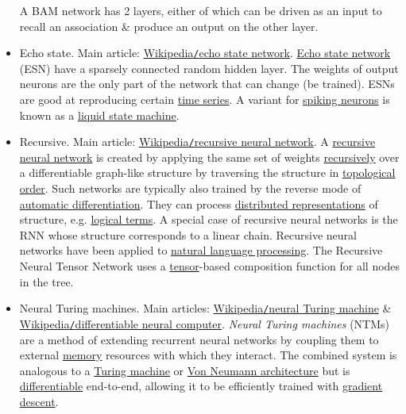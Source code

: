 \documentclass{article}
\begin{document}
\begin{itemize}
	A BAM network has 2 layers, either of which can be driven as an input to recall an association \& produce an output on the other layer.
	\item {\sf Echo state.} Main article: \href{https://en.wikipedia.org/wiki/Echo_state_network}{Wikipedia{\tt/}echo state network}. \href{https://en.wikipedia.org/wiki/Echo_state_network}{Echo state network} (ESN) have a sparsely connected random hidden layer. The weights of output neurons are the only part of the network that can change (be trained). ESNs are good at reproducing certain \href{https://en.wikipedia.org/wiki/Time_series}{time series}. A variant for \href{https://en.wikipedia.org/wiki/Spiking_neural_network}{spiking neurons} is known as a \href{https://en.wikipedia.org/wiki/Liquid_state_machine}{liquid state machine}.
	\item {\sf Recursive.} Main article: \href{https://en.wikipedia.org/wiki/Recursive_neural_network}{Wikipedia{\tt/}recursive neural network}. A \href{https://en.wikipedia.org/wiki/Recursive_neural_network}{recursive neural network} is created by applying the same set of weights \href{https://en.wikipedia.org/wiki/Recursion}{recursively} over a differentiable graph-like structure by traversing the structure in \href{https://en.wikipedia.org/wiki/Topological_sort}{topological order}. Such networks are typically also trained by the reverse mode of \href{https://en.wikipedia.org/wiki/Automatic_differentiation}{automatic differentiation}. They can process \href{https://en.wikipedia.org/wiki/Distributed_representation}{distributed representations} of structure, e.g. \href{https://en.wikipedia.org/wiki/Mathematical_logic}{logical terms}. A special case of recursive neural networks is the RNN whose structure corresponds to a linear chain. Recursive neural networks have been applied to \href{https://en.wikipedia.org/wiki/Natural_language_processing}{natural language processing}. The Recursive Neural Tensor Network uses a \href{https://en.wikipedia.org/wiki/Tensor}{tensor}-based composition function for all nodes in the tree.
	\item {\sf Neural Turing machines.} Main articles: \href{https://en.wikipedia.org/wiki/Neural_Turing_machine}{Wikipedia{\tt/}neural Turing machine} \& \href{https://en.wikipedia.org/wiki/Differentiable_neural_computer}{Wikipedia{\tt/}differentiable neural computer}. {\it Neural Turing machines} (NTMs) are a method of extending recurrent neural networks by coupling them to external \href{https://en.wikipedia.org/wiki/Memory}{memory} resources with which they interact. The combined system is analogous to a \href{https://en.wikipedia.org/wiki/Turing_machine}{Turing machine} or \href{https://en.wikipedia.org/wiki/Von_Neumann_architecture}{Von Neumann architecture} but is \href{https://en.wikipedia.org/wiki/Differentiable_neural_computer}{differentiable} end-to-end, allowing it to be efficiently trained with \href{https://en.wikipedia.org/wiki/Gradient_descent}{gradient descent}.
	

\end{itemize}
\end{document}
